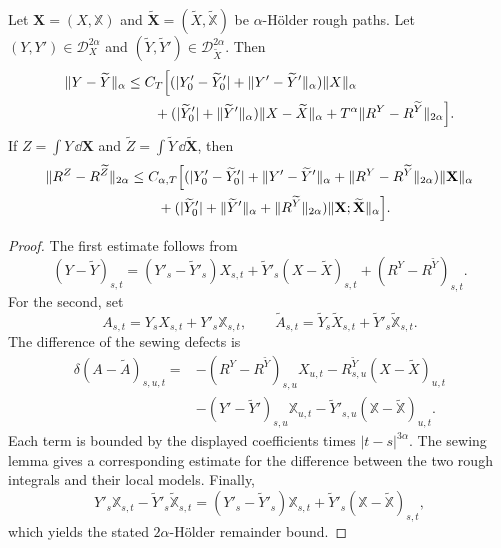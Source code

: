\begin{thm}
Let $\mathbf X=(X,\mathbb X)$ and
$\widetilde{\mathbf X}=(\widetilde X,\widetilde{\mathbb X})$ be
$\alpha$-Hölder rough paths.  Let
$(Y,Y')\in\mathscr D_X^{2\alpha}$ and
$(\widetilde Y,\widetilde Y')\in\mathscr D_{\widetilde X}^{2\alpha}$.  Then
\begin{align*}
\|Y-\widetilde Y\|_\alpha
&\le C_T\Bigl[
 (|Y'_0-\widetilde Y'_0|+\|Y'-\widetilde Y'\|_\alpha)\|X\|_\alpha\\
&\qquad+(|\widetilde Y'_0|+\|\widetilde Y'\|_\alpha)
  \|X-\widetilde X\|_\alpha
 +T^\alpha\|R^Y-R^{\widetilde Y}\|_{2\alpha}
\Bigr].
\end{align*}
If $Z=\int Y\,\dd\mathbf X$ and
$\widetilde Z=\int\widetilde Y\,\dd\widetilde{\mathbf X}$, then
\begin{align*}
\|R^Z-R^{\widetilde Z}\|_{2\alpha}
&\le C_{\alpha,T}\Bigl[
 (|Y'_0-\widetilde Y'_0|
  +\|Y'-\widetilde Y'\|_\alpha
  +\|R^Y-R^{\widetilde Y}\|_{2\alpha})\|\mathbf X\|_\alpha\\
&\qquad+(|\widetilde Y'_0|+\|\widetilde Y'\|_\alpha
  +\|R^{\widetilde Y}\|_{2\alpha})
  \|\mathbf X;\widetilde{\mathbf X}\|_\alpha
\Bigr].
\end{align*}
\end{thm}

\begin{proof}
The first estimate follows from
\[
  (Y-\widetilde Y)_{s,t}
  =(Y'_s-\widetilde Y'_s)X_{s,t}
   +\widetilde Y'_s(X-\widetilde X)_{s,t}
   +(R^Y-R^{\widetilde Y})_{s,t}.
\]
For the second, set
\[
 A_{s,t}=Y_sX_{s,t}+Y'_s\mathbb X_{s,t},\qquad
 \widetilde A_{s,t}
 =\widetilde Y_s\widetilde X_{s,t}
  +\widetilde Y'_s\widetilde{\mathbb X}_{s,t}.
\]
The difference of the sewing defects is
\begin{align*}
\delta(A-\widetilde A)_{s,u,t}
={}&-(R^Y-R^{\widetilde Y})_{s,u}X_{u,t}
    -R^{\widetilde Y}_{s,u}(X-\widetilde X)_{u,t}\\
 &-(Y'-\widetilde Y')_{s,u}\mathbb X_{u,t}
    -\widetilde Y'_{s,u}(\mathbb X-\widetilde{\mathbb X})_{u,t}.
\end{align*}
Each term is bounded by the displayed coefficients times $|t-s|^{3\alpha}$.
The sewing lemma gives a corresponding estimate for the difference between
the two rough integrals and their local models.  Finally,
\[
  Y'_s\mathbb X_{s,t}-\widetilde Y'_s\widetilde{\mathbb X}_{s,t}
  =(Y'_s-\widetilde Y'_s)\mathbb X_{s,t}
   +\widetilde Y'_s(\mathbb X-\widetilde{\mathbb X})_{s,t},
\]
which yields the stated $2\alpha$-Hölder remainder bound.
\end{proof}

